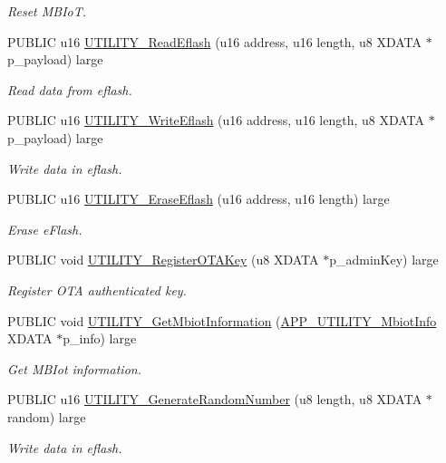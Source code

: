\begin{DoxyCompactItemize}
\begin{DoxyCompactList}\small\item\em Reset M\+B\+IoT. \end{DoxyCompactList}\item 
P\+U\+B\+L\+IC u16 \hyperlink{group___u_t_i_l_i_t_y_gacfcfd6290e2122f99273a44d1a39dc50}{U\+T\+I\+L\+I\+T\+Y\+\_\+\+Read\+Eflash} (u16 address, u16 length, u8 X\+D\+A\+TA $\ast$p\+\_\+payload) large
\begin{DoxyCompactList}\small\item\em Read data from eflash. \end{DoxyCompactList}\item 
P\+U\+B\+L\+IC u16 \hyperlink{group___u_t_i_l_i_t_y_gad8567e861ddc039c6e1e5138eab348d5}{U\+T\+I\+L\+I\+T\+Y\+\_\+\+Write\+Eflash} (u16 address, u16 length, u8 X\+D\+A\+TA $\ast$p\+\_\+payload) large
\begin{DoxyCompactList}\small\item\em Write data in eflash. \end{DoxyCompactList}\item 
P\+U\+B\+L\+IC u16 \hyperlink{group___u_t_i_l_i_t_y_ga98774078e10d87ddf950a6ffeef2dbbf}{U\+T\+I\+L\+I\+T\+Y\+\_\+\+Erase\+Eflash} (u16 address, u16 length) large
\begin{DoxyCompactList}\small\item\em Erase e\+Flash. \end{DoxyCompactList}\item 
P\+U\+B\+L\+IC void \hyperlink{group___u_t_i_l_i_t_y_ga050a441890f0385996584f96ae81dc2a}{U\+T\+I\+L\+I\+T\+Y\+\_\+\+Register\+O\+T\+A\+Key} (u8 X\+D\+A\+TA $\ast$p\+\_\+admin\+Key) large
\begin{DoxyCompactList}\small\item\em Register O\+TA authenticated key. \end{DoxyCompactList}\item 
P\+U\+B\+L\+IC void \hyperlink{group___u_t_i_l_i_t_y_gabaed2c7ea4c9254612613869051f7e63}{U\+T\+I\+L\+I\+T\+Y\+\_\+\+Get\+Mbiot\+Information} (\hyperlink{struct_a_p_p___u_t_i_l_i_t_y___mbiot_info}{A\+P\+P\+\_\+\+U\+T\+I\+L\+I\+T\+Y\+\_\+\+Mbiot\+Info} X\+D\+A\+TA $\ast$p\+\_\+info) large
\begin{DoxyCompactList}\small\item\em Get M\+B\+Iot information. \end{DoxyCompactList}\item 
P\+U\+B\+L\+IC u16 \hyperlink{group___u_t_i_l_i_t_y_ga4a149b28535cc632e0a433b0cf3e8f24}{U\+T\+I\+L\+I\+T\+Y\+\_\+\+Generate\+Random\+Number} (u8 length, u8 X\+D\+A\+TA $\ast$random) large
\begin{DoxyCompactList}\small\item\em Write data in eflash. \end{DoxyCompactList}\end{DoxyCompactItemize}


